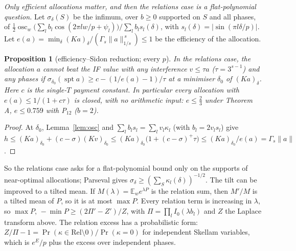 \documentclass[11pt]{article}
\newtheorem{proposition}[theorem]{Proposition}
\theoremstyle{definition}
\begin{document}
\emph{Only efficient allocations matter, and then the relations case is a flat-polynomial question.}  Let $\sigma_\delta(S)$ be the infimum, over
$b\ge0$ supported on $S$ and all phases, of $\frac12\operatorname{osc}_w\big(\sum_lb_l\cos(2\pi lw/p+\psi_l)\big)/\sum_lb_ls_l(\delta)$, with $s_l(\delta)=|\sin(\pi l\delta/p)|$.  Let
$e(a)=\min_\delta(Ka)_\delta/(\Gamma_s\|a\|_{1/s}^{\,s})\le1$ be the efficiency of the allocation.
\begin{proposition}[efficiency--Sidon reduction; every $p$]\label{prop:effsidon}
In the relations case, the allocation $a$ cannot beat the IF value with any interference $v\le\tau a$ ($\tau=3^{s-1}$) and any phases if
$\sigma_{\delta_0}(\operatorname{spt}a)\ge c-(1/e(a)-1)/\tau$ at a minimiser $\delta_0$ of $(Ka)_\delta$.  Here $c$ is the single-$T$ payment constant.  In particular every allocation with
$e(a)\le1/(1+c\tau)$ is closed, with no arithmetic input: $e\le\frac23$ under Theorem A, $e\le0.759$ with P$_{12}$ ($b=2$).
\end{proposition}
\begin{proof}
At $\delta_0$, Lemma~\ref{lem:osc} and $\sum_lb_ls_l=\sum_lv_l\kappa_l$ (with $b_l=2v_ls_l$) give
$h\le(Ka)_{\delta_0}+(c-\sigma)(Kv)_{\delta_0}\le(Ka)_{\delta_0}\big(1+(c-\sigma)^+\tau\big)\le(Ka)_{\delta_0}/e(a)=\Gamma_s\|a\|$.
\end{proof}
So the relations case asks for a flat-polynomial bound only on the supports of near-optimal allocations; Parseval gives $\sigma_\delta\ge(\sum_S\kappa_l(\delta))^{-1/2}$.
The tilt can be improved to a tilted mean.  If $M(\lambda)=\mathbb E_we^{\lambda P}$ is the relation sum, then $M'/M$ is a tilted mean of $P$, so it is at most
$\max P$.  Every relation term is increasing in $\lambda$, so $\max P,\,-\min P\ge(2\Pi'-Z')/Z$, with $\Pi=\prod_lI_0(\lambda b_l)$ and $Z$ the Laplace transform above.  The relation
excess has a probabilistic form: $Z/\Pi-1=\Pr(\kappa\in\mathrm{Rel}\setminus0)/\Pr(\kappa=0)$ for independent Skellam variables, which is $e^E/p$ plus the excess
over independent phases.
\end{document}
